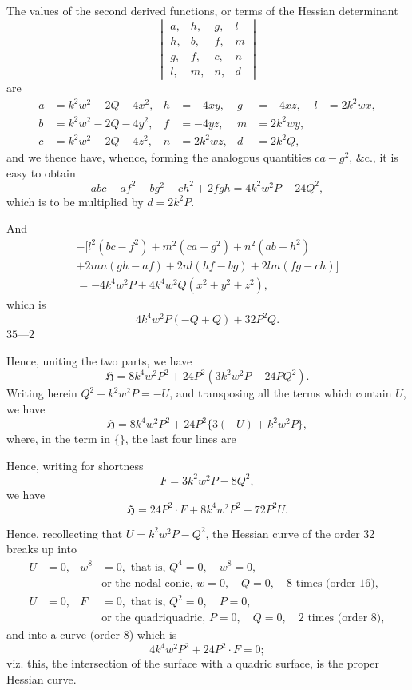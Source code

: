 \documentclass[11pt,a4paper]{book}
\begin{document}
The values of the second derived functions, or terms of the Hessian determinant
\[
\begin{vmatrix}
a, & h, & g, & l \\
h, & b, & f, & m \\
g, & f, & c, & n \\
l, & m, & n, & d
\end{vmatrix}
\]
are
\begin{align*}
a &= k^2 w^2 - 2Q - 4x^2, & h &= -4xy, & g &= -4xz, & l &= 2k^2 w x, \\
b &= k^2 w^2 - 2Q - 4y^2, & f &= -4yz, & m &= 2k^2 w y, \\
c &= k^2 w^2 - 2Q - 4z^2, & n &= 2k^2 w z, & d &= 2k^2 Q,
\end{align*}
and we thence have, whence, forming the analogous quantities $ca - g^2$, \&c., it is easy to obtain
\[
abc - af^2 - bg^2 - ch^2 + 2fgh = 4k^2 w^2 P - 24Q^2,
\]
which is to be multiplied by $d = 2k^2 P$.

And
\begin{multline*}
-[l^2(bc - f^2) + m^2(ca - g^2) + n^2(ab - h^2) \\
+ 2mn(gh - af) + 2nl(hf - bg) + 2lm(fg - ch)] \\
= -4k^4 w^2 P + 4k^4 w^2 Q(x^2 + y^2 + z^2),
\end{multline*}
which is
\[
4k^4 w^2 P(-Q + Q) + 32P^2 Q.
\]
\hfill $35\text{---}2$

Hence, uniting the two parts, we have
\[
\mathfrak{H} = 8k^4 w^2 P^2 + 24P^2(3k^2 w^2 P - 24PQ^2).
\]
Writing herein $Q^2 - k^2 w^2 P = -U$, and transposing all the terms which contain $U$, we have
\[
\mathfrak{H} = 8k^4 w^2 P^2 + 24P^2 \{3(-U) + k^2 w^2 P\},
\]
where, in the term in $\{\}$, the last four lines are

Hence, writing for shortness
\[
F = 3k^2 w^2 P - 8Q^2,
\]
we have
\[
\mathfrak{H} = 24P^2 \cdot F + 8k^4 w^2 P^2 - 72P^2 U.
\]

Hence, recollecting that $U = k^2 w^2 P - Q^2$, the Hessian curve of the order 32 breaks up into
\begin{align*}
U &= 0, & w^8 &= 0, \text{ that is, } Q^4 = 0, \quad w^8 = 0, \\
  &    &      & \text{or the nodal conic, } w = 0, \quad Q = 0, \quad 8 \text{ times (order 16)}, \\
U &= 0, & F &= 0, \text{ that is, } Q^2 = 0, \quad P = 0, \\
  &    &      & \text{or the quadriquadric, } P = 0, \quad Q = 0, \quad 2 \text{ times (order 8)},
\end{align*}
and into a curve (order 8) which is
\[
4k^4 w^2 P^2 + 24P^2 \cdot F = 0;
\]
viz. this, the intersection of the surface with a quadric surface, is the proper Hessian curve.
\end{document}
